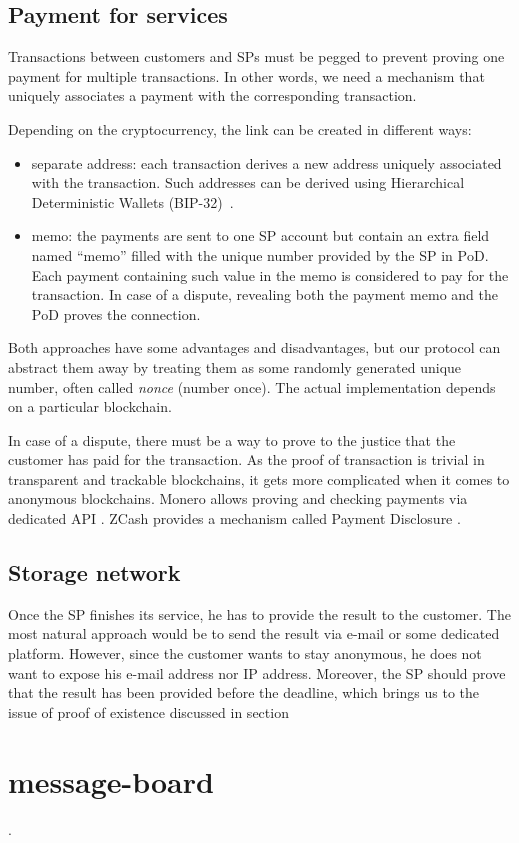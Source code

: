 \documentclass{ieeeaccess}
\begin{document}
\subsection{Payment for services}\label{payment-for-services}
Transactions between customers and SPs must be pegged to prevent proving one payment for multiple transactions. In other
words, we need a mechanism that uniquely associates a payment with the corresponding transaction.

Depending on the cryptocurrency, the link can be created in different
ways:
\begin{itemize}

\item separate address: each transaction derives a new address uniquely associated with the transaction. Such addresses can be derived using Hierarchical Deterministic Wallets (BIP-32)~\cite{bipsbip089}.
\item memo: the payments are sent to one SP account but contain an extra field named ``memo'' filled with the unique number provided by the SP in $\mathrm{PoD}$. Each payment containing such value in the memo is considered to pay for the transaction. In case of a dispute, revealing both the payment memo and the $\mathrm{PoD}$ proves the connection.
\end{itemize}

Both approaches have some advantages and disadvantages, but our protocol can abstract them away by treating them as some randomly generated unique number, often called \textit{nonce} (number once). The actual implementation depends on a particular blockchain.

In case of a dispute, there must be a way to prove to the justice that the customer has paid for the transaction. As the proof of transaction is trivial in transparent and trackable blockchains, it gets more complicated when it comes to anonymous blockchains. Monero allows proving and checking payments via dedicated API \cite{Howtopro46}. ZCash provides a mechanism called Payment Disclosure \cite{AnIntrod25}.

\subsection{Storage network}\label{storage-network}
Once the SP finishes its service, he has to provide the result to the customer. The most natural approach would be to send the result via e-mail or some dedicated platform. However, since the customer wants to stay anonymous, he does not want to expose his e-mail address nor IP address. Moreover, the SP should prove that the result has been provided before the deadline, which brings us to the issue of proof of existence discussed in section ~\section{message-board}.
\end{document}
